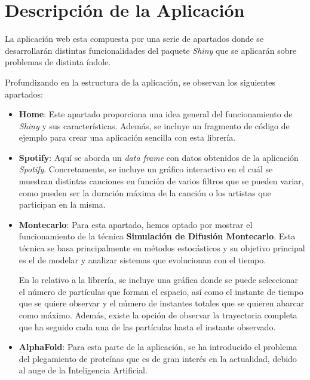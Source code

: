 \documentclass[10pt,a4paper]{article}
\begin{document}
\section{Descripción de la Aplicación}

\noindent La aplicación web esta compuesta por una serie de apartados donde se desarrollarán distintas funcionalidades del paquete \textit{Shiny} que se aplicarán sobre problemas de distinta índole.\newline

\noindent Profundizando en la estructura de la aplicación, se observan los siguientes apartados:

\begin{itemize}
    \item \textbf{Home}: Este apartado proporciona una idea general del funcionamiento de \textit{Shiny} y sus características. Además, se incluye un fragmento de código de ejemplo para crear una aplicación sencilla con esta librería.
    
    \item \textbf{Spotify}: Aquí se aborda un \textit{data frame} con datos obtenidos de la aplicación \textit{Spotify}. Concretamente, se incluye un gráfico interactivo en el cuál se muestran distintas canciones en función de varios filtros que se pueden variar, como pueden ser la duración máxima de la canción o los artistas que participan en la misma.

    \item \textbf{Montecarlo}: Para esta apartado, hemos optado por mostrar el funcionamiento de la técnica \textbf{Simulación de Difusión Montecarlo}. Esta técnica se basa principalmente en métodos estocásticos y su objetivo principal es el de modelar y analizar sistemas que evolucionan con el tiempo.

    \noindent En lo relativo a la librería, se incluye una gráfica donde se puede seleccionar el número de partículas que forman el espacio, así como el instante de tiempo que se quiere observar y el número de instantes totales que se quieren abarcar como máximo. Además, existe la opción de observar la trayectoria completa que ha seguido cada una de las partículas hasta el instante observado.
    
    \item \textbf{AlphaFold}: Para esta parte de la aplicación, se ha introducido el problema del plegamiento de proteínas que es de gran interés en la actualidad, debido al auge de la Inteligencia Artificial.\newline 
    

\end{itemize}
\end{document}
